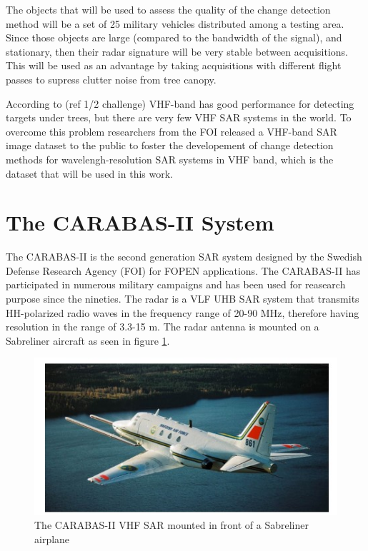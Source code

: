 The objects that will be used to assess the quality of the change detection method will be a set of 25 military vehicles distributed among a testing area.
Since those objects are large (compared to the bandwidth of the signal), and stationary, then their radar signature will be very stable between acquisitions.
This will be used as an advantage by taking acquisitions with different flight passes to supress clutter noise from tree canopy.

According to (ref 1/2 challenge) VHF-band has good performance for detecting targets under trees, but there are very few VHF SAR systems in the world.
To overcome this problem researchers from the FOI released a VHF-band SAR image dataset to the public to foster the developement of 
change detection methods for wavelengh-resolution SAR systems in VHF band, which is the dataset that will be used in this work.


\section{The CARABAS-II System}

The CARABAS-II is the second generation SAR system designed by the Swedish Defense Research Agency (FOI) for FOPEN applications.
The CARABAS-II has participated in numerous military campaigns and has been used for reasearch purpose since the nineties.
The radar is a VLF UHB SAR system that transmits HH-polarized radio waves in the frequency range of 
20-90 MHz, therefore having resolution in the range of 3.3-15 m. The radar antenna is mounted on a Sabreliner aircraft as seen in figure \ref{fig:sabreliner}.

\begin{figure}[h]
    \centering
    \includegraphics{chapter6/sabreliner.jpg}
    \caption{The CARABAS-II VHF SAR mounted in front of a Sabreliner airplane}
    \label{fig:sabreliner}
\end{figure}

